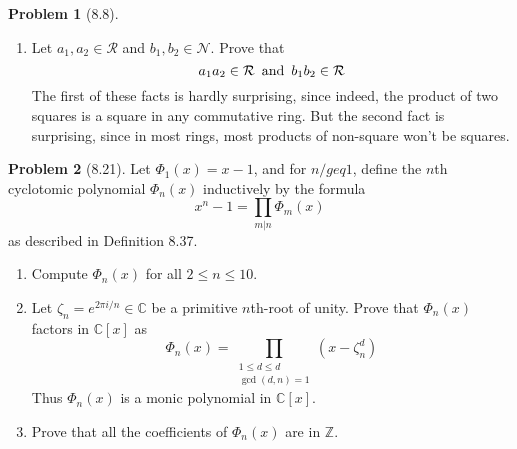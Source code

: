 \documentclass[12pt]{article}
\theoremstyle{definition}
\newtheorem{problem}{Problem}
\begin{document}
\begin{problem}[8.8]
\begin{enumerate}[label=(\alph*)]
\begin{solution}
        \end{solution}

        \item Let $a_1, a_2 \in \mathcal{R}$ and $b_1, b_2 \in \mathcal{N}$. Prove that
              \[
                a_1a_2 \in \mathcal{R} \hspace{5px} \text{and} \hspace{5px} b_1b_2 \in \mathcal{R}
              \]
              The first of these facts is hardly surprising, since indeed, the product of two squares is
              a square in any commutative ring. But the second fact is surprising, since in most rings, 
              most products of non-square won't be squares. 
        \begin{solution}

        \end{solution}
    \end{enumerate}
\end{problem}

\begin{problem}[8.21]
    Let $\Phi_{1}(x) = x - 1$, and for $n /geq 1$, define the $n$th cyclotomic polynomial $\Phi_n(x)$ inductively by the formula
    \[
        x^n - 1 = \prod_{m|n}\Phi_m(x)
    \]
    as described in Definition 8.37.
    \begin{enumerate}[label=(\alph*)]
        \item Compute $\Phi_n(x)$ for all $2 \leq n \leq 10$.
        \begin{solution}

        \end{solution}

        \item Let $\zeta_n = e^{2\pi i/n} \in \mathbb{C}$ be a primitive $n$th-root of unity. Prove that $\Phi_n(x)$ factors in $\mathbb{C}[x]$ as
              \[
                    \Phi_n(x) = \prod_{\substack{1\leq d \leq d\\ \gcd(d, n)=1}}(x - \zeta^d_n)
              \]
              Thus $\Phi_n(x)$ is a monic polynomial in $\mathbb{C}[x]$.
        \begin{solution}

        \end{solution}

        \item Prove that all the coefficients of $\Phi_n(x)$ are in $\mathbb{Z}$.
        \begin{solution}

        \end{solution}
    \end{enumerate}
\end{problem}
\end{document}
